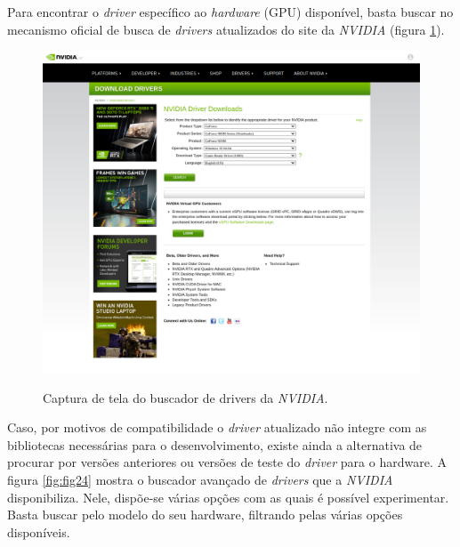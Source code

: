 Para encontrar o \textit{driver} específico ao \textit{hardware} (GPU) disponível, basta buscar no mecanismo oficial de busca de \textit{drivers} atualizados do site da \textit{NVIDIA} (figura \ref{fig:fig23}).

\begin{figure}[H]
    \centering
    \caption{Captura de tela do buscador de drivers da \textit{NVIDIA}.}
    \includegraphics[width=14cm]{fig/nvidia_driver.png}
    \label{fig:fig23}
\end{figure}

Caso, por motivos de compatibilidade o \textit{driver} atualizado não integre com as bibliotecas necessárias para o desenvolvimento, existe ainda a alternativa de procurar por versões anteriores ou versões de teste do \textit{driver} para o hardware. A figura \ref{fig:fig24} mostra o buscador avançado de \textit{drivers} que a \textit{NVIDIA} disponibiliza. Nele, dispõe-se várias opções com as quais é possível experimentar. Basta buscar pelo modelo do seu hardware, filtrando pelas várias opções disponíveis.

